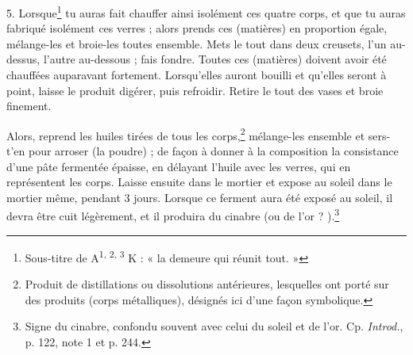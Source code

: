 \documentclass[a4paper, 11pt, oneside, polutonikogreek, french]{article}
\begin{document}
5. Lorsque\footnote{Sous-titre de A\textsuperscript{1, 2, 3} K : « la demeure qui réunit tout. »} tu auras fait chauffer ainsi isolément ces quatre corps, et que tu auras fabriqué isolément ces verres ; alors prends ces (matières) en proportion égale, mélange-les et broie-les toutes ensemble. Mets le tout dans deux creusets, l'un au-dessus, l'autre au-dessous ; fais fondre. Toutes ces (matières) doivent avoir été chauffées auparavant fortement. Lorsqu'elles auront bouilli et qu'elles seront à point, laisse le produit digérer, puis refroidir. Retire le tout des vases et broie finement.

Alors, reprend les huiles tirées de tous les corps,\footnote{Produit de distillations ou dissolutions antérieures, lesquelles ont porté sur des produits (corps métalliques), désignés ici d'une façon symbolique.} mélange-les ensemble et sers-t'en pour arroser (la poudre) ; de façon à donner à la composition la consistance d'une pâte fermentée épaisse, en délayant l'huile avec les verres, qui en représentent les corps. Laisse ensuite dans le mortier et expose au soleil dans le mortier même, pendant 3 jours. Lorsque ce ferment aura été exposé au soleil, il devra être cuit légèrement, et il produira du cinabre (ou de l'or ? ).\footnote{Signe du cinabre, confondu souvent avec celui du soleil et de l'or. Cp. \emph{Introd.}, p. 122, note 1 et p. 244.}

\bigskip
\centerline{\EightStarTaper}
\centerline{\EightStarTaper\EightStarTaper}
\bigskip
\end{document}
